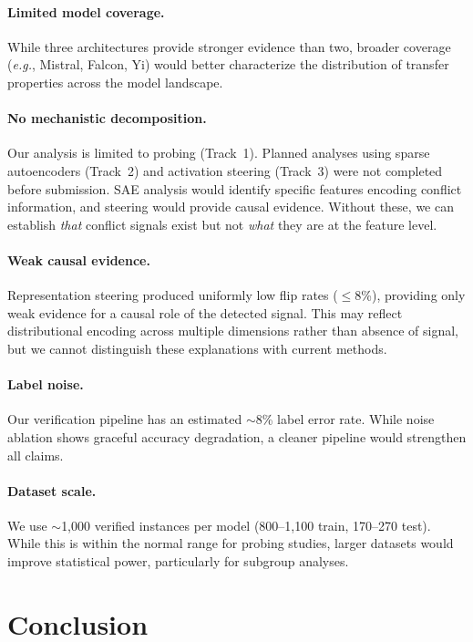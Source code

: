 \documentclass[11pt]{article}
\newcommand{\eg}{\textit{e.g.}}
\begin{document}
\paragraph{Limited model coverage.}
While three architectures provide stronger evidence than two, broader coverage (\eg, Mistral, Falcon, Yi) would better characterize the distribution of transfer properties across the model landscape.

\paragraph{No mechanistic decomposition.}
Our analysis is limited to probing (Track~1).
Planned analyses using sparse autoencoders (Track~2) and activation steering (Track~3) were not completed before submission.
SAE analysis would identify specific features encoding conflict information, and steering would provide causal evidence.
Without these, we can establish \emph{that} conflict signals exist but not \emph{what} they are at the feature level.

\paragraph{Weak causal evidence.}
Representation steering produced uniformly low flip rates ($\leq$8\%), providing only weak evidence for a causal role of the detected signal.
This may reflect distributional encoding across multiple dimensions rather than absence of signal, but we cannot distinguish these explanations with current methods.

\paragraph{Label noise.}
Our verification pipeline has an estimated $\sim$8\% label error rate.
While noise ablation shows graceful accuracy degradation, a cleaner pipeline would strengthen all claims.

\paragraph{Dataset scale.}
We use $\sim$1,000 verified instances per model (800--1,100 train, 170--270 test).
While this is within the normal range for probing studies, larger datasets would improve statistical power, particularly for subgroup analyses.

\section{Conclusion}
\end{document}
